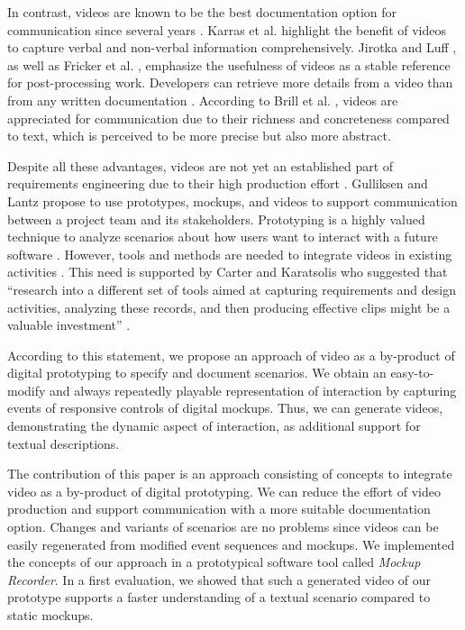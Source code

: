 \documentclass[conference]{IEEEtran}
\begin{document}
In contrast, videos are known to be the best documentation option for 
communication since several years \cite{Ambler.2002}. Karras et al. 
\cite{Karras.2016b} highlight the benefit of videos to capture verbal and 
non-verbal information comprehensively. Jirotka and Luff \cite{Jirotka.2006}, 
as well as Fricker et al. \cite{Fricker.2015}, emphasize the usefulness of 
videos as a stable reference for post-processing work. Developers can retrieve 
more details from a video than from any written documentation 
\cite{DeMarco.1990}. According to Brill et al. \cite{Brill.2010}, videos are 
appreciated for communication due to their richness and concreteness compared 
to text, which is perceived to be more precise but also more abstract.

Despite all these advantages, videos are not yet an established part of 
requirements engineering due to their high production effort 
\cite{Karras.2016}. Gulliksen and Lantz \cite{Gulliksen.2003} propose to use 
prototypes, mockups, and videos to support communication between a project team 
and its stakeholders. Prototyping is a highly valued technique to analyze 
scenarios about how users want to interact with a future software 
\cite{Rouibah.2009}. However, tools and methods are needed to integrate videos 
in existing activities \cite{Gulliksen.2003}. This need is supported by Carter 
and Karatsolis who suggested that ``research into a different set of tools 
aimed at capturing requirements and design activities, analyzing these records, 
and then producing effective clips might be a valuable investment'' \cite[p. 
4]{Carter.2009}.

According to this statement, we propose an approach of video as a 
by-product of digital prototyping to specify and document scenarios. We obtain 
an easy-to-modify and always repeatedly playable representation of interaction 
by capturing events of responsive controls of digital mockups. Thus, we can 
generate videos, demonstrating the dynamic aspect of interaction, as 
additional support for textual descriptions.

The contribution of this paper is an approach consisting of concepts to 
integrate video as a by-product of digital prototyping. We can reduce the 
effort of video production and support communication with a more suitable 
documentation option. Changes and variants of scenarios are no problems since 
videos can be easily regenerated from modified event sequences and mockups. We 
implemented the concepts of our approach in a prototypical software tool called 
\textit{Mockup Recorder}. In a first evaluation, we showed that such a 
generated video of our prototype supports a faster understanding of a textual 
scenario compared to static mockups.
\end{document}
